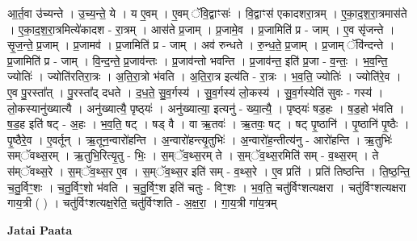 \documentclass[17pt]{extarticle}
\begin{document}
आ॒र्त॒वा उ॑च्यन्ते । उ॒च्य॒न्ते॒ ये । य ए॒वम् । ए॒वम् ॅवि॒द्वाꣳसः॑ । वि॒द्वाꣳस॑ एकादशरा॒त्रम् । ए॒का॒द॒श॒रा॒त्रमास॑ते । ए॒का॒द॒श॒रा॒त्रमित्ये॑कादश - रा॒त्रम् । आस॑ते प्र॒जाम् । प्र॒जामे॒व । प्र॒जामिति॑ प्र - जाम् । ए॒व सृ॑जन्ते । सृ॒ज॒न्ते॒ प्र॒जाम् । प्र॒जामव॑ । प्र॒जामिति॑ प्र - जाम् । अव॑ रुन्धते । रु॒न्ध॒ते॒ प्र॒जाम् । प्र॒जाम् ॅवि॑न्दन्ते । प्र॒जामिति॑ प्र - जाम् । वि॒न्द॒न्ते॒ प्र॒जाव॑न्तः । प्र॒जाव॑न्तो भवन्ति । प्र॒जाव॑न्त॒ इति॑ प्र॒जा - व॒न्तः॒ । भ॒व॒न्ति॒ ज्योतिः॑ । ज्योति॑रतिरा॒त्रः । अ॒ति॒रा॒त्रो भ॑वति । अ॒ति॒रा॒त्र इत्य॑ति - रा॒त्रः । भ॒व॒ति॒ ज्योतिः॑ । ज्योति॑रे॒व । ए॒व पु॒रस्ता᳚त् । पु॒रस्ता᳚द् दधते । द॒ध॒ते॒ सु॒व॒र्गस्य॑ । सु॒व॒र्गस्य॑ लो॒कस्य॑ । सु॒व॒र्गस्येति॑ सुवः - गस्य॑ । लो॒कस्यानु॑ख्यात्यै । अनु॑ख्यात्यै॒ पृष्ठ्‍यः॑ । अनु॑ख्यात्या॒ इत्यनु॑ - ख्या॒त्यै॒ । पृष्ठ्‍यः॑ षड॒हः । ष॒ड॒हो भ॑वति । ष॒ड॒ह इति॑ षट् - अ॒हः । भ॒व॒ति॒ षट् । षड् वै । वा ऋ॒तवः॑ । ऋ॒तवः॒ षट् । षट् पृ॒ष्ठानि॑ । पृ॒ष्ठानि॑ पृ॒ष्ठैः । पृ॒ष्ठैरे॒व । ए॒वर्तून् । ऋ॒तून॒न्वारो॑हन्ति । अ॒न्वारो॑हन्त्यृ॒तुभिः॑ । अ॒न्वारो॑ह॒न्तीत्य॑नु - आरो॑हन्ति । ऋ॒तुभिः॑ सम्ॅवथ्स॒रम् । ऋ॒तुभि॒रित्यृ॒तु - भिः॒ । स॒म्ॅव॒थ्स॒रम् ते । स॒म्ॅव॒थ्स॒रमिति॑ सम् - व॒थ्स॒रम् । ते स॑म्ॅवथ्स॒रे । स॒म्ॅव॒थ्स॒र ए॒व । स॒म्ॅव॒थ्स॒र इति॑ सम् - व॒थ्स॒रे । ए॒व प्रति॑ । प्रति॑ तिष्ठन्ति । ति॒ष्ठ॒न्ति॒ च॒तु॒र्विꣳ॒॒शः । च॒तु॒र्विꣳ॒॒शो भ॑वति । च॒तु॒र्विꣳ॒॒श इति॑ चतुः - विꣳ॒॒शः । भ॒व॒ति॒ चतु॑र्विꣳशत्यक्षरा । चतु॑र्विꣳशत्यक्षरा गाय॒त्री ( ) । चतु॑र्विꣳशत्यक्ष॒रेति॒ चतु॑र्विꣳशति - अ॒क्ष॒रा॒ । गा॒य॒त्री गा॑य॒त्रम् \newline

\textbf{Jatai Paata} \newline
\end{document}
